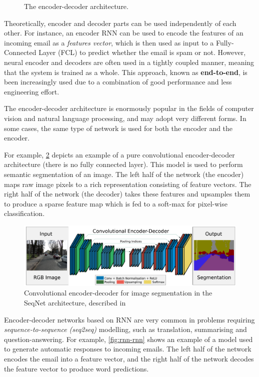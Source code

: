 \begin{figure}[hpt]
	\centering
	
	\caption{The encoder-decoder architecture.}
	\label{fig:encoder-decoder}
\end{figure}

Theoretically, encoder and decoder parts can be used independently of each other. For instance, an encoder RNN can be used to encode the features of an incoming email as a \textit{features vector}, which is then used as input to a Fully-Connected Layer (FCL) to predict whether the email is spam or not. However, neural encoder and decoders are often used in a tightly coupled manner, meaning that the system is trained as a whole. This approach, known as \textbf{end-to-end}, is been increasingly used due to a combination of good performance and less engineering effort.

The encoder-decoder architecture is enormously popular in the fields of computer vision and natural language processing, and may adopt very different forms. In some cases, the same type of network is used for both the encoder and the encoder.

For example, \cref{fig:cnn-cnn} depicts an example of a pure convolutional encoder-decoder architecture (there is no fully connected layer). This model is used to perform semantic segmentation of an image. The left half of the network (the encoder) maps raw image pixels to a rich representation consisting of feature vectors. The right half of the network (the decoder) takes these features and upsamples them to produce a sparse feature map which is fed to a soft-max for pixel-wise classification.

\begin{figure}[hpt]
	\centering
	\includegraphics[scale=0.45]{images/ch3/cnn-cnn.png}
	\caption{Convolutional encoder-decoder for image segmentation in the SeqNet architecture, described in \citep{Badrinarayanan2017}}
	\label{fig:cnn-cnn}
\end{figure}

Encoder-decoder networks based on RNN are very common in problems requiring \textit{sequence-to-sequence (seq2seq)} modelling, such as translation, summarising and question-answering. For example, \cref{fig:rnn-rnn} shows an example of a model used to generate automatic responses to incoming emails. The left half of the network encodes the email into a feature vector, and the right half of the network decodes the feature vector to produce word predictions. 

